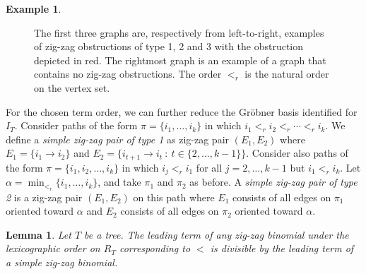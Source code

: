 \documentclass[11pt]{article}
\newtheorem{lemm}[theo]{Lemma}
\theoremstyle{definition}
\newtheorem{example}[theo]{Example}
\numberwithin{equation}{section}
\begin{document}
\begin{example}
\begin{figure}
        \caption{The first three graphs are, respectively from left-to-right, examples of zig-zag obstructions of type 1, 2 and 3 with the obstruction depicted in red. The rightmost graph is an example of a graph that contains no zig-zag obstructions. The order $<_r$ is the natural order on the vertex set.}
        \label{fig: zig-zag obstructions}
\end{figure}
\end{example}

For the chosen term order, we can further reduce the Gr\"obner basis identified for $I_T$.  
Consider paths of the form $\pi = \{i_1,\ldots, i_k\}$ in which $i_1 <_r i_2 <_r \cdots <_r i_k$.  
We define a \emph{simple zig-zag pair of type 1} as zig-zag pair $(E_1,E_2)$ where
$E_1 = \{i_1 \rightarrow i_{2}\}$ and $E_2 = \{i_{t+1} \rightarrow i_{t}~ :~ t\in\{2,\ldots, k-1\}\}$.
Consider also paths of the form $\pi = \{i_1,i_2,\ldots, i_k\}$ in which $i_j <_r i_1$ for all $j = 2,\ldots, k-1$ but $i_1 <_r i_k$.  
Let $\alpha = \min_{<_r}\{i_1,\ldots, i_k\}$, and take $\pi_1$ and $\pi_2$ as before.  
A \emph{simple zig-zag pair of type 2} is a zig-zag pair $(E_1,E_2)$ on this path where $E_1$ consists of all edges on $\pi_1$ oriented toward $\alpha$ and $E_2$ consists of all edges on $\pi_2$ oriented toward $\alpha$. 

\begin{lemm}
    \label{lem: simple zig-zags}
    Let $T$ be a tree.  The leading term of any zig-zag binomial under the lexicographic order on $R_T$ corresponding to $<$ is divisible by the leading term of a simple zig-zag binomial.
\end{lemm}
\end{document}
